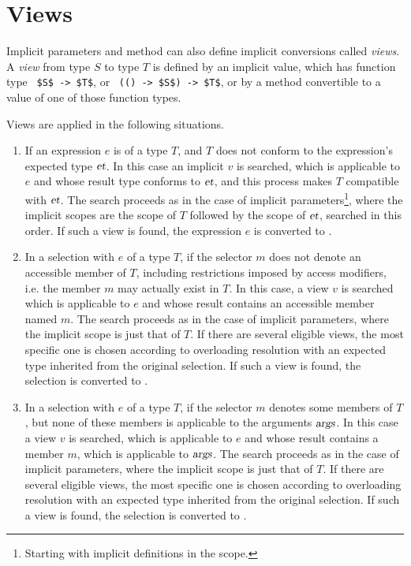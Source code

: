 \section{Views}
\label{sec:views}

Implicit parameters and method can also define implicit conversions called {\em views}. A {\em view} from type $S$ to type $T$ is defined by an implicit value, which has function type ~\lstinline!$S$ -> $T$!, or ~\lstinline!(() -> $S$) -> $T$!, or by a method convertible to a value of one of those function types. 

Views are applied in the following situations.
\begin{enumerate}
\item If an expression $e$ is of a type $T$, and $T$ does not conform to the expression's expected type $\mbox{\sl et}$. In this case an implicit $v$ is searched, which is applicable to $e$ and whose result type conforms to $\mbox{\sl et}$, and this process makes $T$ compatible with $\mbox{\sl et}$. The search proceeds as in the case of implicit parameters\footnote{Starting with implicit definitions in the scope.}, where the implicit scopes are the scope of $T$ followed by the scope of $\mbox{\sl et}$, searched in this order. If such a view is found, the expression $e$ is converted to . 

\item In a selection  with $e$ of a type $T$, if the selector $m$ does not denote an accessible member of $T$, including restrictions imposed by access modifiers, i.e. the member $m$ may actually exist in $T$. In this case, a view $v$ is searched which is applicable to $e$ and whose result contains an accessible member named $m$. The search proceeds as in the case of implicit parameters, where the implicit scope is just that of $T$. If there are several eligible views, the most specific one is chosen according to overloading resolution with an expected type inherited from the original selection. If such a view is found, the selection  is converted to . 

\item In a selection  with $e$ of a type $T$, if the selector $m$ denotes some members of $T$, but none of these members is applicable to the arguments $\mbox{\sl args}$. In this case a view $v$ is searched, which is applicable to $e$ and whose result contains a member $m$, which is applicable to $\mbox{\sl args}$. The search proceeds as in the case of implicit parameters, where the implicit scope is just that of $T$. If there are several eligible views, the most specific one is chosen according to overloading resolution with an expected type inherited from the original selection. If such a view is found, the selection  is converted to . 
\end{enumerate}

